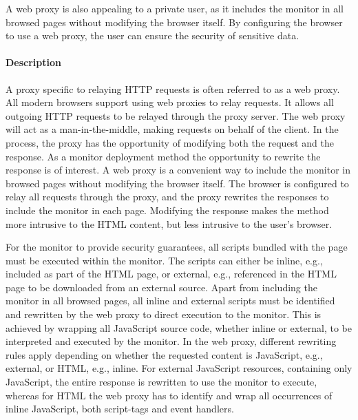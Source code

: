 \documentclass{llncs}
\newcommand{\todo}[1]{\colorbox{red}{\textcolor{white}{\sffamily\bfseries\scriptsize TODO}} \textcolor{red}{#1} \textcolor{red}{$\blacktriangleleft$}}
\begin{document}
A web proxy is also appealing to a private user, as it includes the monitor in all browsed pages without modifying 
the browser itself. By configuring the browser to use a web proxy, the user can ensure the security 
of sensitive data.

\paragraph{Description}
A proxy specific to relaying HTTP requests is often referred to as a web proxy.
All modern browsers support using web proxies to relay requests.
It allows all outgoing HTTP requests to be 
relayed through the proxy server. The web proxy will act as a man-in-the-middle, making 
requests on behalf of the client. In the process, the proxy has the 
opportunity of modifying both the request and the response. 
As a monitor deployment method the opportunity to rewrite the response is 
of interest. A web proxy is a convenient way to include the monitor in browsed pages without 
modifying the browser itself. The browser is configured to relay 
all requests through the proxy, and the proxy rewrites the responses to include 
the monitor in each page. Modifying the response makes the method more 
intrusive to the HTML content, but less intrusive to the user's browser. 

For the monitor to provide security guarantees, all scripts bundled with 
the page must be executed within the monitor. The scripts can either be inline, 
e.g., included as part of the HTML page, or external, e.g., referenced in the 
HTML page to be downloaded from an external source.
Apart from including the monitor in all browsed pages, all inline and external 
scripts must be identified and rewritten by the web proxy to direct execution to the monitor.
This is achieved by wrapping all JavaScript source code, whether inline or 
external, to be interpreted and executed by the monitor.
In the web proxy, different rewriting rules apply depending on whether the 
requested content is JavaScript, e.g., external, or HTML, e.g., inline. 
For external 
JavaScript resources, containing only JavaScript, the entire response is rewritten to use the monitor to execute, whereas 
for HTML the web proxy has to identify and wrap all occurrences of inline 
JavaScript, both script-tags and event handlers.
\end{document}
